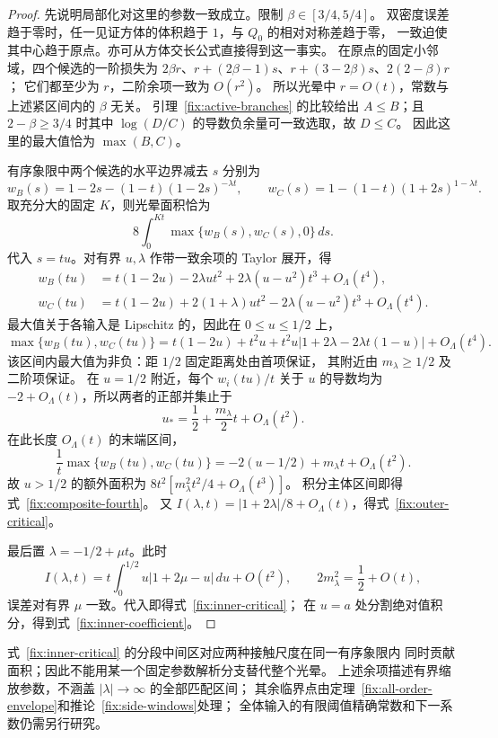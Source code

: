 \begin{proof}
先说明局部化对这里的参数一致成立。限制 $\beta\in[3/4,5/4]$。
双密度误差趋于零时，任一见证方体的体积趋于 $1$，与 $Q_0$ 的相对对称差趋于零，
一致迫使其中心趋于原点。亦可从方体交长公式直接得到这一事实。
在原点的固定小邻域，四个候选的一阶损失为
$2\beta r$、$r+(2\beta-1)s$、$r+(3-2\beta)s$、$2(2-\beta)r$；
它们都至少为 $r$，二阶余项一致为 $O(r^2)$。
所以光晕中 $r=O(t)$，常数与上述紧区间内的 $\beta$ 无关。
引理~\ref{fix:active-branches} 的比较给出 $A\le B$；且 $2-\beta\ge3/4$
时其中 $\log(D/C)$ 的导数负余量可一致选取，故 $D\le C$。
因此这里的最大值恰为 $\max(B,C)$。

有序象限中两个候选的水平边界减去 $s$ 分别为
\[
 w_B(s)=1-2s-(1-t)(1-2s)^{-\lambda t},\qquad
 w_C(s)=1-(1-t)(1+2s)^{1-\lambda t}.
\]
取充分大的固定 $K$，则光晕面积恰为
\[
 8\int_0^{Kt}\max\{w_B(s),w_C(s),0\}\,ds.
\]
代入 $s=tu$。对有界 $u,\lambda$ 作带一致余项的 Taylor 展开，得
\begin{align*}
 w_B(tu)&=t(1-2u)-2\lambda u t^2
                  +2\lambda(u-u^2)t^3+O_\Lambda(t^4),\\
 w_C(tu)&=t(1-2u)+2(1+\lambda)u t^2
                  -2\lambda(u-u^2)t^3+O_\Lambda(t^4).
\end{align*}
最大值关于各输入是 Lipschitz 的，因此在 $0\le u\le1/2$ 上，
\[
 \max\{w_B(tu),w_C(tu)\}
 =t(1-2u)+t^2u
  +t^2u|1+2\lambda-2\lambda t(1-u)|+O_\Lambda(t^4).
\]
该区间内最大值为非负：距 $1/2$ 固定距离处由首项保证，
其附近由 $m_\lambda\ge1/2$ 及二阶项保证。
在 $u=1/2$ 附近，每个 $w_i(tu)/t$ 关于 $u$ 的导数均为
$-2+O_\Lambda(t)$，所以两者的正部并集止于
\[
 u_* =\frac12+\frac{m_\lambda}2t+O_\Lambda(t^2).
\]
在此长度 $O_\Lambda(t)$ 的末端区间，
\[
 \frac1t\max\{w_B(tu),w_C(tu)\}
 =-2(u-1/2)+m_\lambda t+O_\Lambda(t^2).
\]
故 $u>1/2$ 的额外面积为
$8t^2[m_\lambda^2t^2/4+O_\Lambda(t^3)]$。
积分主体区间即得式~\eqref{fix:composite-fourth}。
又 $I(\lambda,t)=|1+2\lambda|/8+O_\Lambda(t)$，得式~\eqref{fix:outer-critical}。

最后置 $\lambda=-1/2+\mu t$。此时
\[
 I(\lambda,t)=t\int_0^{1/2}u|1+2\mu-u|\,du+O(t^2),\qquad
 2m_\lambda^2=\frac12+O(t),
\]
误差对有界 $\mu$ 一致。代入即得式~\eqref{fix:inner-critical}；
在 $u=a$ 处分割绝对值积分，得到式~\eqref{fix:inner-coefficient}。
\end{proof}

\begin{remark}
式~\eqref{fix:inner-critical} 的分段中间区对应两种接触尺度在同一有序象限内
同时贡献面积；因此不能用某一个固定参数解析分支替代整个光晕。
上述余项描述有界缩放参数，不涵盖 $|\lambda|\to\infty$ 的全部匹配区间；
其余临界点由定理~\ref{fix:all-order-envelope}和推论~\ref{fix:side-windows}处理；
全体输入的有限阈值精确常数和下一系数仍需另行研究。
\end{remark}
